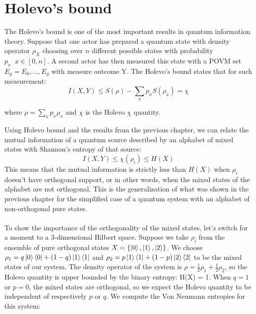 \documentclass[journal, letterpaper]{IEEEtran}
\begin{document}
\section{Holevo's bound}

The Holevo's bound is one of the most important results in quantum information theory.
Suppose that one actor has prepared a quantum state with density operator $\rho_X$ choosing over $n$ different possible states with probability $p_x \; \; x \in [0,n]$. A second actor has then measured this state with a POVM set $E_y = {E_0, ..., E_y}$ with measure outcome Y. The Holevo's bound states that for such measurement:
\[I(X,Y) \leq S(\rho) - \sum_x p_xS(\rho_x) = \chi\]

where \(\rho = \sum_x p_x \rho_x \) and $\chi$ is the Holevo $\chi$ quantity. 

Using Holevo bound and the results from the previous chapter, we can relate the mutual information of a quantum source described by an alphabet of mixed states with Shannon's entropy of that source: 
\[ I(X,Y) \le \chi(\rho_i)\le H(X)\]
This means that the mutual information is strictly less than $H(X)$ when $\rho_i$ doesn't have orthogonal support, or in other words, when the mixed states of the alphabet are not orthogonal. This is the generalization of what was shown in the previous chapter for the simplified case of a quantum system with an alphabet of non-orthogonal pure states. 
\\
\\
To show the importance of the orthogonality of the mixed states, let's switch for a moment to a 3-dimensional Hilbert space. Suppose we take $\rho_i$ from the ensemble of pure orthogonal states ${X}=\{\ket{0},\ket{1},\ket{2}\}$.  We choose $\rho_1 = q\ket{0}\bra{0} + (1-q)\ket{1}\bra{1}$ and $\rho_2 = p\ket{1}\bra{1}+(1-p)\ket{2}\bra{2}$ to be the mixed states of our system. The density operator of the system is $\rho = \frac{1}{2}\rho_1 + \frac{1}{2}\rho_2$, so the Holevo quantity is upper bounded by the binary entropy: H(X) = 1. When $q=1$ or $p=0$, the mixed states are orthogonal, so we expect the Holevo quantity to be independent of respectively $p$ or $q$. We compute the Von Neumann entropies for this system: 
\end{document}
